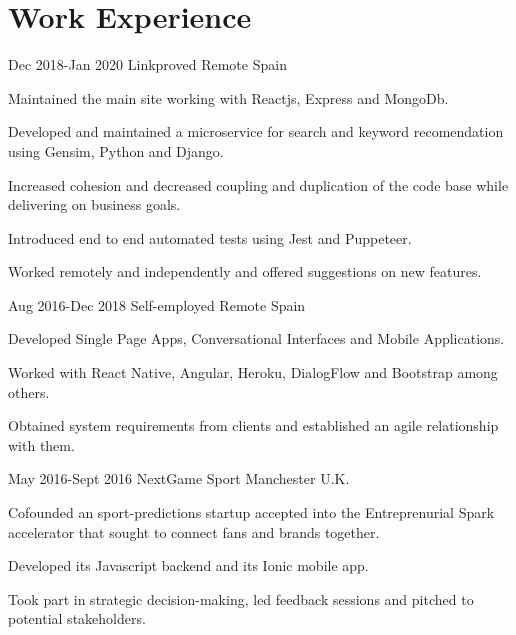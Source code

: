 \documentclass[10pt]{CurriculumVitae}
\begin{document}
  \section{Work Experience}
      {Dec 2018-Jan 2020}
      {Linkproved}
      {Remote}
      {Spain}
      {
        \item Maintained the main site working with Reactjs, Express and MongoDb.
        \item Developed and maintained a microservice for search and keyword recomendation using Gensim, Python and Django.
        \item Increased cohesion and decreased coupling and duplication of the code base while delivering on business goals.
        \item Introduced end to end automated tests using Jest and Puppeteer.
        \item Worked remotely and independently and offered suggestions on new features.
      }

      {Aug 2016-Dec 2018}
      {Self-employed}
      {Remote}
      {Spain}
      {
        \item Developed Single Page Apps, Conversational Interfaces and Mobile Applications.
        \item Worked with React Native, Angular, Heroku, DialogFlow and Bootstrap among others.
        \item Obtained system requirements from clients and established an agile relationship with them.
      }
   
      {May 2016-Sept 2016}
      {NextGame Sport} 
      {Manchester}
      {U.K.}
      {
        \item Cofounded an sport-predictions startup accepted into the
          Entreprenurial Spark accelerator that sought to connect fans and brands together.
        \item Developed its Javascript backend and its Ionic mobile app.
        \item Took part in strategic decision-making, led feedback sessions and pitched to potential stakeholders.
      }
  
\end{document}
